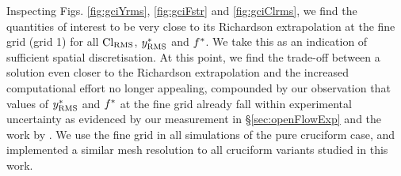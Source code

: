 \documentclass[oneside]{utmthesis}
\begin{document}
Inspecting Figs. \ref{fig:gciYrms}, \ref{fig:gciFstr} and \ref{fig:gciClrms}, we find the quantities of interest to be very close to its Richardson extrapolation at the fine grid (grid 1) for all $\text{Cl}_{\text{RMS}}$, $y^{*}_{\text{RMS}}$ and $f^{*}$. We take this as an indication of sufficient spatial discretisation. At this point, we find the trade-off between a solution even closer to the Richardson extrapolation and the increased computational effort no longer appealing, compounded by our observation that values of $y^{*}_{\text{RMS}}$ and $f^{*}$ at the fine grid already fall within experimental uncertainty as evidenced by our measurement in \S \ref{sec:openFlowExp} and the work by \citet{Koide2013}. We use the fine grid in all simulations of the pure cruciform case, and implemented a similar mesh resolution to all cruciform variants studied in this work.
\end{document}
